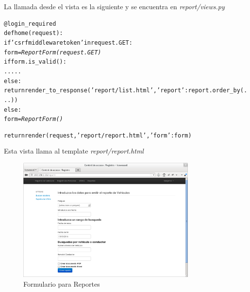La llamada desde el vista es la siguiente y se encuentra en {\it report/views.py}

\begin{alltt}
@login_required
def home(request):
    if 'csrfmiddlewaretoken' in request.GET:
        form = \emph{ReportForm(request.GET)}
        if form.is\_valid():
            .....
    else:
        return render\_to\_response('report/list.html', {'report': report.order\_by(...)})
    else:
        form = \emph{ReportForm()}

    return render(request, 'report/report.html', {'form': form})
\end{alltt}

Esta vista llama al template {\it report/report.html}

\begin{figure}[h]
  \begin{center}
    \includegraphics[width=0.8\textwidth]{figures/chapter5/reportes.png}
    \caption[Formulario para Reportes]{Formulario para Reportes}
  \end{center}
\end{figure}


